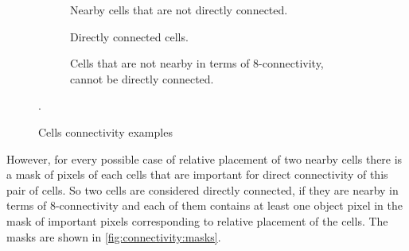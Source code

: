 \documentclass[hidelinks]{llncs}
\newcommand{\texten}[1]{#1}
\newcommand{\textru}[1]{}
\begin{document}
\begin{figure}
  \centering
  \begin{subfigure}[t]{0.3\linewidth}
    \centering
    \caption{Nearby cells that are not directly connected.}
  \end{subfigure}
  \quad
  \begin{subfigure}[t]{0.3\linewidth}
    \centering
    \caption{Directly connected cells.}
  \end{subfigure}
  \quad
  \begin{subfigure}[t]{0.3\linewidth}
    \centering
    \caption{Cells that are not nearby in terms of 8-connectivity, cannot be
    directly connected.}
  \end{subfigure}
  \caption{Cells connectivity examples}
  \label{fig:connectivity:examples}.
\end{figure}

\texten{
However, for every possible case of relative placement of two nearby cells there
is a mask of pixels of each cells that are important for direct connectivity of
this pair of cells. So two cells are considered directly connected, if they are
nearby in terms of 8-connectivity and each of them contains at least one object
pixel in the mask of important pixels corresponding to relative placement of the
cells. The masks are shown in \autoref{fig:connectivity:masks}.
}\textru{
Тем не менее, можно заметить, что анализировать можно не все биты цвета, а
только некоторую маску тех бит, которые важны для связности двух конкретных
клеток. Эти маски показаны на \autoref{fig:connectivity:masks}.
}
\end{document}

